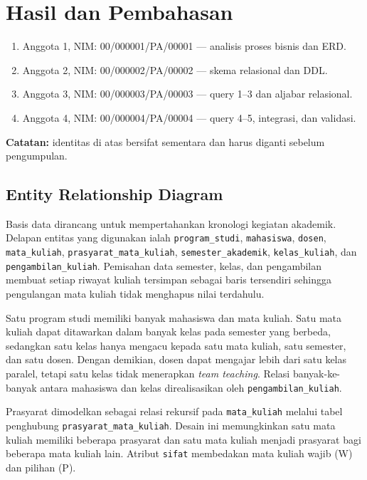 \chapter{Hasil dan Pembahasan}

\begin{tcolorbox}[title=Daftar Anggota Kelompok]
\begin{enumerate}[noitemsep]
    \item Anggota 1, NIM: 00/000001/PA/00001 --- analisis proses bisnis dan ERD.
    \item Anggota 2, NIM: 00/000002/PA/00002 --- skema relasional dan DDL.
    \item Anggota 3, NIM: 00/000003/PA/00003 --- query 1--3 dan aljabar relasional.
    \item Anggota 4, NIM: 00/000004/PA/00004 --- query 4--5, integrasi, dan validasi.
\end{enumerate}
\textbf{Catatan:} identitas di atas bersifat sementara dan harus diganti sebelum pengumpulan.
\end{tcolorbox}

\section{Entity Relationship Diagram}

Basis data dirancang untuk mempertahankan kronologi kegiatan akademik. Delapan entitas yang digunakan ialah \texttt{program\_studi}, \texttt{mahasiswa}, \texttt{dosen}, \texttt{mata\_kuliah}, \texttt{prasyarat\_mata\_kuliah}, \texttt{semester\_akademik}, \texttt{kelas\_kuliah}, dan \texttt{pengambilan\_kuliah}. Pemisahan data semester, kelas, dan pengambilan membuat setiap riwayat kuliah tersimpan sebagai baris tersendiri sehingga pengulangan mata kuliah tidak menghapus nilai terdahulu.

Satu program studi memiliki banyak mahasiswa dan mata kuliah. Satu mata kuliah dapat ditawarkan dalam banyak kelas pada semester yang berbeda, sedangkan satu kelas hanya mengacu kepada satu mata kuliah, satu semester, dan satu dosen. Dengan demikian, dosen dapat mengajar lebih dari satu kelas paralel, tetapi satu kelas tidak menerapkan \textit{team teaching}. Relasi banyak-ke-banyak antara mahasiswa dan kelas direalisasikan oleh \texttt{pengambilan\_kuliah}.

Prasyarat dimodelkan sebagai relasi rekursif pada \texttt{mata\_kuliah} melalui tabel penghubung \texttt{prasyarat\_mata\_kuliah}. Desain ini memungkinkan satu mata kuliah memiliki beberapa prasyarat dan satu mata kuliah menjadi prasyarat bagi beberapa mata kuliah lain. Atribut \texttt{sifat} membedakan mata kuliah wajib (W) dan pilihan (P).

